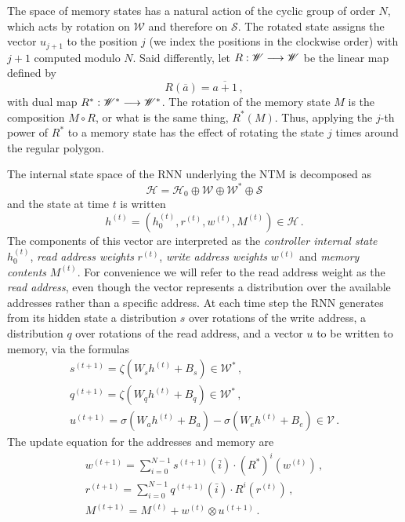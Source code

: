 \documentclass[english,letter paper,12pt,leqno]{article}
\theoremstyle{example}
\numberwithin{equation}{section}
\def\be{\begin{equation}}
\def\ee{\end{equation}}
\begin{document}
The space of memory states has a natural action of the cyclic group of order $N$, which acts by rotation on $\mathscr{W}$ and therefore on $\mathscr{S}$. The rotated state assigns the vector $u_{j+1}$ to the position $j$ (we index the positions in the clockwise order) with $j + 1$ computed modulo $N$. Said differently, let $R: \mathscr{W} \longrightarrow \mathscr{W}$ be the linear map defined by
\[
R( \overline{a} ) = \overline{a+1}\,,
\]
with dual map $R^*: \mathscr{W}^* \longrightarrow \mathscr{W}^*$. The rotation of the memory state $M$ is the composition $M \circ R$, or what is the same thing, $R^*( M )$. Thus, applying the $j$-th power of $R^*$ to a memory state has the effect of rotating the state $j$ times around the regular polygon.

The internal state space of the RNN underlying the NTM is decomposed as
\be\label{eq:decomp}
\mathscr{H} = \mathscr{H}_0 \oplus \mathscr{W} \oplus \mathscr{W}^* \oplus \mathscr{S}
\ee
and the state at time $t$ is written
\[
h^{(t)} = (h_0^{(t)}, r^{(t)}, w^{(t)}, M^{(t)}) \in \mathscr{H}\,.
\]
The components of this vector are interpreted as the \emph{controller internal state} $h_0^{(t)}$, \emph{read address weights} $r^{(t)}$, \emph{write address weights} $w^{(t)}$ and \emph{memory contents} $M^{(t)}$. For convenience we will refer to the read address weight as the \emph{read address}, even though the vector represents a distribution over the available addresses rather than a specific address. At each time step the RNN generates from its hidden state a distribution $s$ over rotations of the write address, a distribution $q$ over rotations of the read address, and a vector $u$ to be written to memory, via the formulas
\begin{gather*}
s^{(t+1)} = \zeta( W_s h^{(t)} + B_s ) \in \mathscr{W}^*\,,\\
q^{(t+1)} = \zeta( W_q h^{(t)} + B_q ) \in \mathscr{W}^*\,,\\
u^{(t+1)} = \sigma( W_a h^{(t)} + B_a ) - \sigma( W_e h^{(t)} + B_e ) \in \mathscr{V}\,.
\end{gather*}
The update equation for the addresses \cite[Eq. (8)]{ntm} and memory \cite[Eq. (3),(4)]{ntm} are
\begin{align}
w^{(t+1)} = \sum_{i=0}^{N-1} s^{(t+1)}(\bar{i}) \cdot (R^*)^i( w^{(t)} )\,,\label{eq:ntm_update1}
\\
r^{(t+1)} = \sum_{i=0}^{N-1} q^{(t+1)}(\bar{i}) \cdot R^i( r^{(t)} )\,,\label{eq:ntm_update2}\\
M^{(t+1)} = M^{(t)} + w^{(t)} \otimes u^{(t+1)}\,.\label{eq:ntm_update3}
\end{align}
\end{document}
